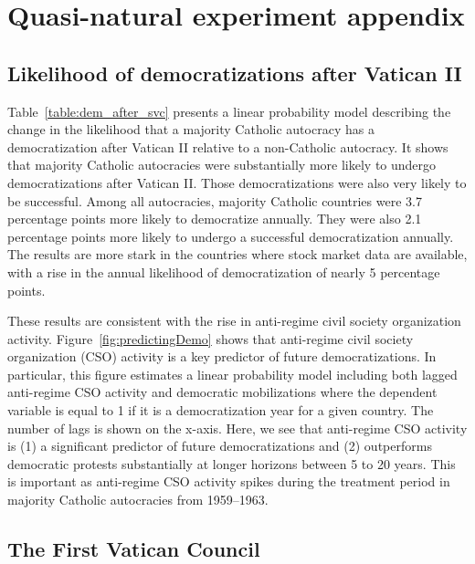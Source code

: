 
\section{Quasi-natural experiment appendix}\label{section:natExpApp}

\subsection{Likelihood of democratizations after Vatican II}
\label{section:antiCSO}

Table~\ref{table:dem_after_svc} presents a linear probability model describing the change in the likelihood that a majority Catholic autocracy has a democratization after Vatican II relative to a non-Catholic autocracy.  It shows that majority Catholic autocracies were substantially more likely to undergo democratizations after Vatican II. Those democratizations were also very likely to be successful. Among all autocracies, majority Catholic countries were 3.7 percentage points more likely to democratize annually. They were also 2.1 percentage points more likely to undergo a successful democratization annually. The results are more stark in the countries where stock market data are available, with a rise in the  annual likelihood of democratization of nearly 5 percentage points.



These results are consistent with the rise in anti-regime civil society organization activity. Figure~\ref{fig:predictingDemo} shows that anti-regime civil society organization (CSO) activity is a key predictor of future democratizations. In particular, this figure estimates a linear probability model including both lagged anti-regime CSO activity and democratic mobilizations where the dependent variable is equal to 1 if it is a democratization year for a given country. The number of lags is shown on the x-axis. Here, we see that anti-regime CSO activity is (1) a significant predictor of future democratizations and (2) outperforms democratic protests substantially at longer horizons between 5 to 20 years. This is important as anti-regime CSO activity spikes during the treatment period in majority Catholic autocracies from 1959--1963.



\subsection{The First Vatican Council}\label{section:fvc}

